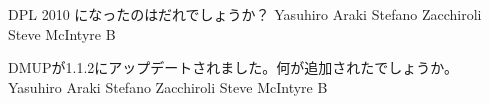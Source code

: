 %

\santaku
{DPL 2010 になったのはだれでしょうか？}
{Yasuhiro Araki} %
{Stefano Zacchiroli}
{Steve McIntyre}
{B}
{}


\santaku
{DMUPが1.1.2にアップデートされました。何が追加されたでしょうか。}
{Yasuhiro Araki} %
{Stefano Zacchiroli}
{Steve McIntyre}
{B}
{}
